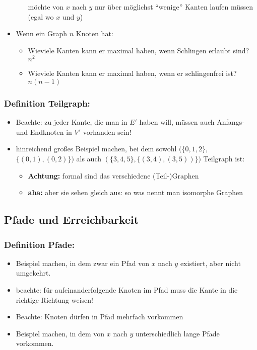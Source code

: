 \documentclass[12pt]{article}
\theoremstyle{margin}
\theoremstyle{margin}
\begin{document}
\begin{itemize}
\begin{itemize}
      möchte von $x$ nach $y$ nur über möglichst "`wenige"'
      Kanten laufen müssen (egal wo $x$ und $y$)
    \end{itemize}
  \item Wenn ein Graph $n$ Knoten hat:
    \begin{itemize}
    \item Wieviele Kanten kann er maximal haben, wenn Schlingen
      erlaubt sind? $n^2$
    \item Wieviele Kanten kann er maximal haben, wenn er schlingenfrei
      ist? $n(n-1)$ \\
    \end{itemize}
  \end{itemize}

\subsubsection{Definition Teilgraph:}
  \begin{itemize}
  \item Beachte: zu jeder Kante, die man in $E'$ haben will, müssen
    auch Anfangs- und Endknoten in $V'$ vorhanden sein!
  \item hinreichend großes Beispiel machen, bei dem sowohl
    $(\{0,1,2\},$ $\{(0,1),(0,2)\})$ als auch
    $(\{3,4,5\},\{(3,4),(3,5))\})$ Teilgraph ist:
    \begin{itemize}
    \item \textbf{Achtung:} formal sind das verschiedene (Teil-)Graphen
    \item \textbf{aha:} aber sie sehen gleich aus: so was nennt man
      isomorphe Graphen
    \end{itemize}
  \end{itemize}

\subsection{Pfade und Erreichbarkeit}

\subsubsection{Definition Pfade:}
  \begin{itemize}
  \item Beispiel machen, in dem zwar ein Pfad von $x$ nach $y$
    existiert, aber nicht umgekehrt.
  \item beachte: für aufeinanderfolgende Knoten im Pfad muss die Kante
    in die richtige Richtung weisen!
  \item Beachte: Knoten dürfen in Pfad mehrfach vorkommen
  \item Beispiel machen, in dem von $x$ nach $y$ unterschiedlich lange
    Pfade vorkommen.
  \end{itemize}
\end{document}
